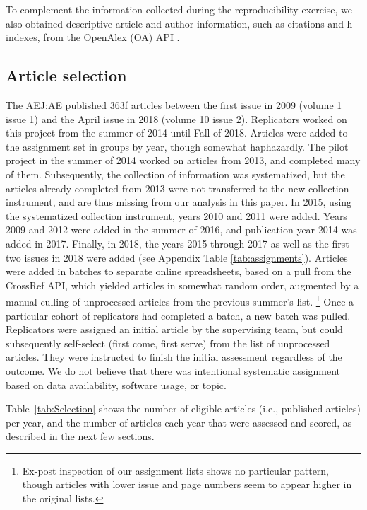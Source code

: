 \documentclass{cje} %
\theoremstyle{plain}%
\theoremstyle{definition}
\theoremstyle{remark}
\begin{document}
To complement the information collected during the reproducibility exercise, we also obtained descriptive article and author information, such as citations and h-indexes, from 
the OpenAlex (OA) \ac{API} \citep{openalex2022,ourresearch2023}.

\subsection{Article selection}

The \ac{AEJ:AE} published 363f articles between the first issue in 2009 (volume 1 issue 1) and the April issue in 2018 (volume 10 issue 2). Replicators worked on this project from the summer of 2014 until Fall of 2018. Articles were added to the assignment set in groups by year, though somewhat haphazardly. The pilot project in the summer of 2014 worked on articles from 2013, and completed many of them. Subsequently, the collection of information was systematized, but the articles already completed from 2013 were not transferred to the new collection instrument, and are thus missing from our analysis in this paper. In 2015, using the systematized collection instrument,  years 2010 and 2011 were added. Years 2009 and 2012 were added in the summer of 2016, and publication year 2014 was added in 2017. Finally, in 2018, the years 2015 through 2017 as well as the first two issues in 2018 were added (see Appendix Table \ref{tab:assignments}). Articles were added in batches to separate online spreadsheets, based on a pull from the CrossRef API, which yielded articles in somewhat random order, augmented by a manual culling of unprocessed articles from the previous summer's list.%
%
\footnote{Ex-post inspection of our assignment lists shows no particular pattern, though articles with lower issue and page numbers seem to appear higher in the original lists.}
% 
Once a particular cohort of replicators had completed a batch, a new batch was pulled. 
%
Replicators were assigned an initial article by the supervising team, but could subsequently self-select (first come, first serve) from the list of unprocessed articles. They were instructed to finish the initial assessment regardless of the outcome. We do not believe that there was intentional systematic assignment based on data availability, software usage, or topic.


Table~\ref{tab:Selection} shows the number of eligible articles (i.e., published articles) per year, and the number of articles each year that were assessed and scored, as described in the next few sections. 
\end{document}
